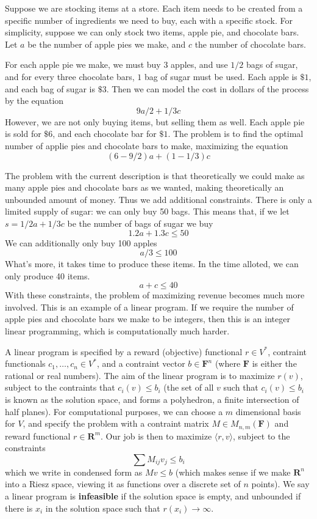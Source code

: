     \begin{example}
    Suppose we are stocking items at a store. Each item needs to be created from a specific number of ingredients we need to buy, each with a specific stock. For simplicity, suppose we can only stock two items, apple pie, and chocolate bars. Let $a$ be the number of apple pies we make, and $c$ the number of chocolate bars.

    For each apple pie we make, we must buy $3$ apples, and use $1/2$ bags of sugar, and for every three chocolate bars, $1$ bag of sugar must be used. Each apple is $\$1$, and each bag of sugar is $\$3$. Then we can model the cost in dollars of the process by the equation
    \[ 9a/2 + 1/3c \]
    However, we are not only buying items, but selling them as well. Each apple pie is sold for $\$6$, and each chocolate bar for $\$1$. The problem is to find the optimal number of applie pies and chocolate bars to make, maximizing the equation
    \[ (6 - 9/2)a + (1 - 1/3)c \]

    The problem with the current description is that theoretically we could make as many apple pies and chocolate bars as we wanted, making theoretically an unbounded amount of money. Thus we add additional constraints. There is only a limited supply of sugar: we can only buy 50 bags. This means that, if we let $s = 1/2a + 1/3c$ be the number of bags of sugar we buy
    \[ 1.2a + 1.3c \leq 50 \]
    We can additionally only buy 100 apples
    \[ a/3 \leq 100 \]
    What's more, it takes time to produce these items. In the time alloted, we can only produce 40 items.
    \[ a + c \leq 40 \]
    With these constraints, the problem of maximizing revenue becomes much more involved. This is an example of a linear program. If we require the number of apple pies and chocolate bars we make to be integers, then this is an integer linear programming, which is computationally much harder.
    \end{example}

    A linear program is specified by a reward (objective) functional $r \in V^*$, contraint functionals $c_1, \dots, c_n \in V^*$, and a contraint vector $b \in \mathbf{F}^n$ (where $\mathbf{F}$ is either the rational or real numbers). The aim of the linear program is to maximize $r(v)$, subject to the contraints that $c_i(v) \leq b_i$ (the set of all $v$ such that $c_i(v) \leq b_i$ is known as the solution space, and forms a polyhedron, a finite intersection of half planes). For computational purposes, we can choose a $m$ dimensional basis for $V$, and specify the problem with a contraint matrix $M \in M_{n,m}(\mathbf{F})$ and reward functional $r \in \mathbf{R}^m$. Our job is then to maximize $\langle r, v \rangle$, subject to the constraints
    \[ \sum M_{ij} v_j \leq b_i \]
    which we write in condensed form as $Mv \leq b$ (which makes sense if we make $\mathbf{R}^n$ into a Riesz space, viewing it as functions over a discrete set of $n$ points). We say a linear program is {\bf infeasible} if the solution space is empty, and unbounded if there is $x_i$ in the solution space such that $r(x_i) \to \infty$.

